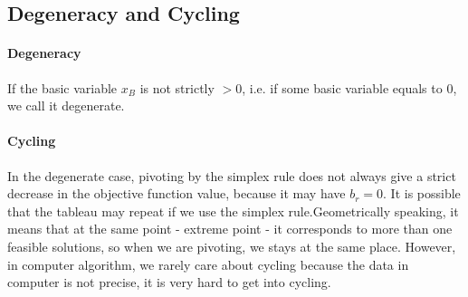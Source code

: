             \subsection{Degeneracy and Cycling}
                \paragraph{Degeneracy}
                    If the basic variable $x_B$ is not strictly $> 0$, i.e. if some basic variable equals to 0, we call it degenerate.

                \paragraph{Cycling}
                    In the degenerate case, pivoting by the simplex rule does not always give a strict decrease in the objective function value, because it may have $b_r = 0$. It is possible that the tableau may repeat if we use the simplex rule.Geometrically speaking, it means that at the same point - extreme point - it corresponds to more than one feasible solutions, so when we are pivoting, we stays at the same place. However, in computer algorithm, we rarely care about cycling because the data in computer is not precise, it is very hard to get into cycling.

